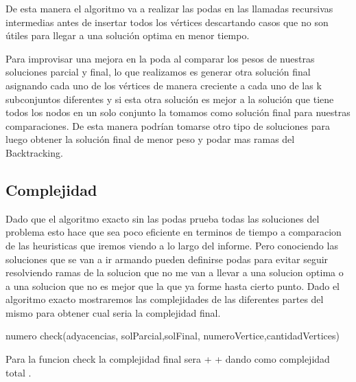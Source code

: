 De esta manera el algoritmo va a realizar las podas en las llamadas recursivas intermedias antes de insertar todos los vértices descartando casos que no son útiles para llegar  a una solución optima en menor tiempo.

Para improvisar una mejora en la poda al comparar los pesos de nuestras soluciones parcial y final, lo que realizamos es generar otra solución final asignando cada uno de los vértices de manera creciente a cada uno de las k subconjuntos diferentes y si esta otra solución es mejor a la solución que tiene todos los nodos en un solo conjunto la tomamos como solución final para nuestras comparaciones.
De esta manera podrían tomarse otro tipo de soluciones para luego obtener la solución final de menor peso y podar mas ramas del Backtracking.	

\subsection{Complejidad}
Dado que el algoritmo exacto sin las podas prueba todas las soluciones del problema esto hace que sea poco eficiente en terminos de tiempo a comparacion de las heuristicas que iremos viendo a lo largo del informe. Pero conociendo las soluciones que se van a ir armando pueden definirse podas para evitar seguir resolviendo ramas de la solucion que no me van a llevar a una solucion optima o a una solucion que no es mejor que la que ya forme hasta cierto punto.
Dado el algoritmo exacto mostraremos las complejidades de las diferentes partes del mismo para obtener cual seria la complejidad final.

\begin{algorithm}
  \begin{algorithmic}[1]\parskip=1mm
 \caption{numero check(adyacencias, solParcial,solFinal, numeroVertice,cantidadVertices)}
  \end{algorithmic}
  \end{algorithm}

Para la funcion check la complejidad final sera  + +  dando como complejidad total .


